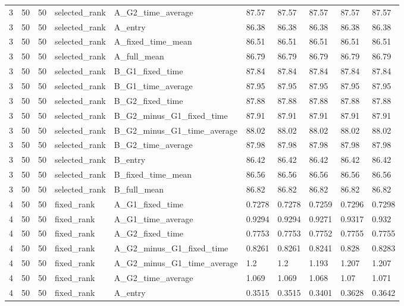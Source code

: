 \begin{longtable}{llllllllll}
3 & 50 & 50 & selected\_rank & A\_G2\_time\_average & 87.57 & 87.57 & 87.57 & 87.57 & 87.57 \\
3 & 50 & 50 & selected\_rank & A\_entry & 86.38 & 86.38 & 86.38 & 86.38 & 86.38 \\
3 & 50 & 50 & selected\_rank & A\_fixed\_time\_mean & 86.51 & 86.51 & 86.51 & 86.51 & 86.51 \\
3 & 50 & 50 & selected\_rank & A\_full\_mean & 86.79 & 86.79 & 86.79 & 86.79 & 86.79 \\
3 & 50 & 50 & selected\_rank & B\_G1\_fixed\_time & 87.84 & 87.84 & 87.84 & 87.84 & 87.84 \\
3 & 50 & 50 & selected\_rank & B\_G1\_time\_average & 87.95 & 87.95 & 87.95 & 87.95 & 87.95 \\
3 & 50 & 50 & selected\_rank & B\_G2\_fixed\_time & 87.88 & 87.88 & 87.88 & 87.88 & 87.88 \\
3 & 50 & 50 & selected\_rank & B\_G2\_minus\_G1\_fixed\_time & 87.91 & 87.91 & 87.91 & 87.91 & 87.91 \\
3 & 50 & 50 & selected\_rank & B\_G2\_minus\_G1\_time\_average & 88.02 & 88.02 & 88.02 & 88.02 & 88.02 \\
3 & 50 & 50 & selected\_rank & B\_G2\_time\_average & 87.98 & 87.98 & 87.98 & 87.98 & 87.98 \\
3 & 50 & 50 & selected\_rank & B\_entry & 86.42 & 86.42 & 86.42 & 86.42 & 86.42 \\
3 & 50 & 50 & selected\_rank & B\_fixed\_time\_mean & 86.56 & 86.56 & 86.56 & 86.56 & 86.56 \\
3 & 50 & 50 & selected\_rank & B\_full\_mean & 86.82 & 86.82 & 86.82 & 86.82 & 86.82 \\
4 & 50 & 50 & fixed\_rank & A\_G1\_fixed\_time & 0.7278 & 0.7278 & 0.7259 & 0.7296 & 0.7298 \\
4 & 50 & 50 & fixed\_rank & A\_G1\_time\_average & 0.9294 & 0.9294 & 0.9271 & 0.9317 & 0.932 \\
4 & 50 & 50 & fixed\_rank & A\_G2\_fixed\_time & 0.7753 & 0.7753 & 0.7752 & 0.7755 & 0.7755 \\
4 & 50 & 50 & fixed\_rank & A\_G2\_minus\_G1\_fixed\_time & 0.8261 & 0.8261 & 0.8241 & 0.828 & 0.8283 \\
4 & 50 & 50 & fixed\_rank & A\_G2\_minus\_G1\_time\_average & 1.2 & 1.2 & 1.193 & 1.207 & 1.207 \\
4 & 50 & 50 & fixed\_rank & A\_G2\_time\_average & 1.069 & 1.069 & 1.068 & 1.07 & 1.071 \\
4 & 50 & 50 & fixed\_rank & A\_entry & 0.3515 & 0.3515 & 0.3401 & 0.3628 & 0.3642 \\

\end{longtable}
